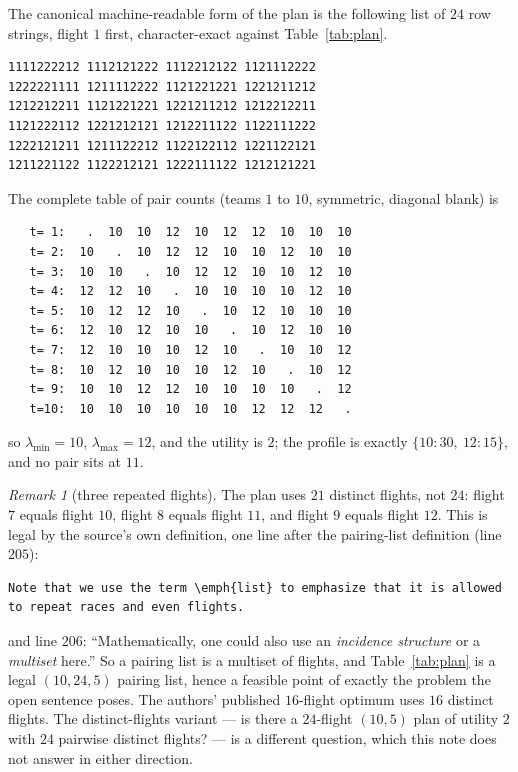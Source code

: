 \documentclass[11pt]{amsart}
\theoremstyle{remark}
\newtheorem*{remark}{Remark}
\begin{document}
The canonical machine-readable form of the plan is the following list of $24$
row strings, flight $1$ first, character-exact against Table~\ref{tab:plan}.
\begin{verbatim}
1111222212 1112121222 1112212122 1121112222
1222221111 1211112222 1121221221 1221211212
1212212211 1121221221 1221211212 1212212211
1121222112 1221212121 1212211122 1122111222
1222121211 1211122212 1122122112 1221122121
1211221122 1122212121 1222111122 1212121221
\end{verbatim}

The complete table of pair counts (teams $1$ to $10$, symmetric, diagonal
blank) is
\begin{verbatim}
   t= 1:   .  10  10  12  10  12  12  10  10  10
   t= 2:  10   .  10  12  12  10  10  12  10  10
   t= 3:  10  10   .  10  12  12  10  10  12  10
   t= 4:  12  12  10   .  10  10  10  10  12  10
   t= 5:  10  12  12  10   .  10  12  10  10  10
   t= 6:  12  10  12  10  10   .  10  12  10  10
   t= 7:  12  10  10  10  12  10   .  10  10  12
   t= 8:  10  12  10  10  10  12  10   .  10  12
   t= 9:  10  10  12  12  10  10  10  10   .  12
   t=10:  10  10  10  10  10  10  12  12  12   .
\end{verbatim}
so $\lambda_{\min}=10$, $\lambda_{\max}=12$, and the utility is $2$; the profile
is exactly $\{10:30,\ 12:15\}$, and no pair sits at $11$.

\begin{remark}[three repeated flights]
The plan uses $21$ distinct flights, not $24$: flight $7$ equals flight $10$,
flight $8$ equals flight $11$, and flight $9$ equals flight $12$. This is legal
by the source's own definition, one line after the pairing-list definition
(line $205$):
\begingroup\footnotesize
\begin{verbatim}
Note that we use the term \emph{list} to emphasize that it is allowed
to repeat races and even flights.
\end{verbatim}
\endgroup
and line $206$: ``Mathematically, one could also use an \emph{incidence
structure} or a \emph{multiset} here.'' So a pairing list is a multiset of
flights, and Table~\ref{tab:plan} is a legal $(10,24,5)$ pairing list, hence a
feasible point of exactly the problem the open sentence poses. The authors'
published $16$-flight optimum uses $16$ distinct flights. The
distinct-flights variant --- is there a $24$-flight $(10,5)$ plan of utility
$2$ with $24$ pairwise distinct flights? --- is a different question, which
this note does not answer in either direction.
\end{remark}
\end{document}
